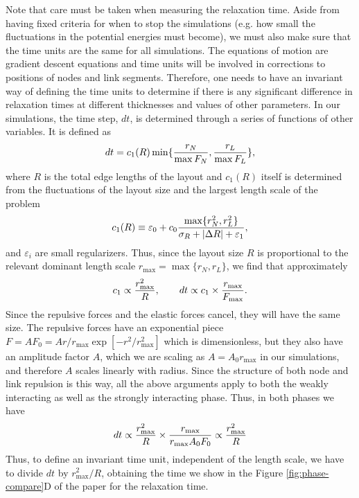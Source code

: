 \documentclass[endfloats,nofootinbib,preprint,floatfix,titlepage,superscriptaddress,linenumbers]{revtex4-1} %
\begin{document}
Note that care must be taken when measuring the relaxation time. 
Aside from having fixed criteria for when to stop the simulations (e.g. how small the fluctuations in the potential energies must become), we must also make sure that the time units are the same for all simulations. 
The equations of motion are gradient descent equations and time units will be involved in corrections to positions of nodes and link segments. 
Therefore, one needs to have an invariant way of defining the time units to determine if there is any significant difference in relaxation times at different thicknesses and values of other parameters. 
In our simulations, the time step, $dt$, is determined through a series of functions of other variables. 
It is defined as 
$$dt = c_1( R) \min\{{r_N\over \max{F_N}},{r_L\over \max{F_L}}\}, $$
where $R$ is the total edge lengths of the layout and $c_1(R)$ itself is determined from the fluctuations of the layout size and the largest length scale of the problem
$$ c_1(R) \equiv \varepsilon_0 + c_0 {\max\{r_N^2, r_L^2\}\over \sigma_R + |\Delta R|+\varepsilon_1},$$
and $\varepsilon_i$ are small regularizers. 
Thus, since the layout size $R$ is proportional to the relevant dominant length scale $r_{\max} = \max{\{r_N, r_L\}} $, we find that approximately
\[ c_1 \propto {r_{\max}^2\over R}, \qquad dt \propto c_1 \times {r_{\max} \over F_{\max}}. \]
Since the repulsive forces and the elastic forces cancel, they will have the same size. The repulsive forces have an exponential piece $ F = A F_0 = A r/r_{\max} \exp[-r^2/r^2_{\max}] $ which is dimensionless, but they also have an amplitude factor $A$, which we are scaling as $A = A_0 r_{\max}$ in our simulations, and therefore $A$ scales linearly with radius. 
Since the structure of both node and link repulsion is this way, all the above arguments apply to both the weakly interacting as well as the strongly interacting phase. %
Thus, in both phases we have
$$ dt \propto {r_{\max}^2\over R} \times {r_{\max} \over r_{\max} A_0 F_0 } \propto {r_{\max}^2\over R} $$
Thus, to define an invariant time unit, independent of the length scale, we have to divide $dt$ by $r_{\max}^2/ R$, obtaining the time we show in the Figure \ref{fig:phase-compare}D of the paper for the relaxation time. 
\end{document}
